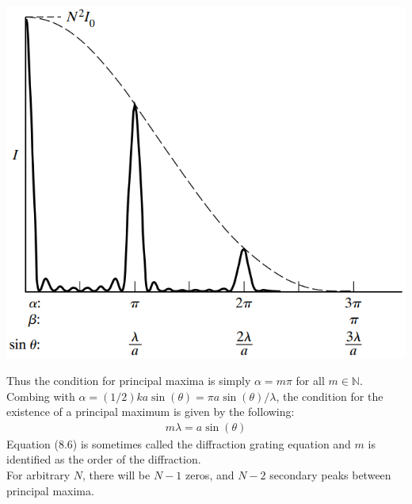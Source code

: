 \documentclass[11pt]{book}
\theoremstyle{break}
\theoremstyle{break}
\newcommand{\N}{\mathbb{N}}
\begin{document}
\begin{center}
\includegraphics[scale=0.69]{PrincipalMax}
\end{center}
Thus the condition for principal maxima is simply $\alpha = m\pi$ for all $m \in \N$. Combing with $\alpha = (1/2) ka\sin(\theta) = \pi a \sin(\theta)/\lambda$, the condition for the existence of a principal maximum is given by the following:
\begin{align}
m\lambda = a\sin(\theta)
\end{align} 
Equation (8.6) is sometimes called the diffraction grating equation and $m$ is identified as the order of the diffraction.\\

For arbitrary $N$, there will be $N-1$ zeros, and $N-2$ secondary peaks between principal maxima. 

\newpage
\end{document}
